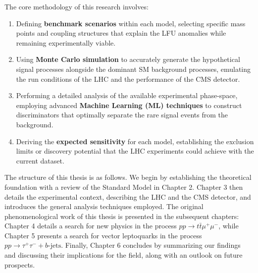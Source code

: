 The core methodology of this research involves:
\begin{enumerate}
    \item Defining \textbf{benchmark scenarios} within each model, selecting specific mass points and coupling structures that explain the LFU anomalies while remaining experimentally viable.
    \item Using \textbf{Monte Carlo simulation} to accurately generate the hypothetical signal processes alongside the dominant SM background processes, emulating the run conditions of the LHC and the performance of the CMS detector.
    \item Performing a detailed analysis of the available experimental phase-space, employing advanced \textbf{Machine Learning (ML) techniques} to construct discriminators that optimally separate the rare signal events from the background.
    \item Deriving the \textbf{expected sensitivity} for each model, establishing the exclusion limits or discovery potential that the LHC experiments could achieve with the current dataset.
\end{enumerate}

The structure of this thesis is as follows. We begin by establishing the theoretical foundation with a review of the Standard Model in Chapter 2. Chapter 3 then details the experimental context, describing the LHC and the CMS detector, and introduces the general analysis techniques employed. The original phenomenological work of this thesis is presented in the subsequent chapters: Chapter 4 details a search for new physics in the process $pp \to t\bar{t}\mu^+\mu^-$, while Chapter 5 presents a search for vector leptoquarks in the process $pp \to \tau^+\tau^- + b\text{-jets}$. Finally, Chapter 6 concludes by summarizing our findings and discussing their implications for the field, along with an outlook on future prospects.
